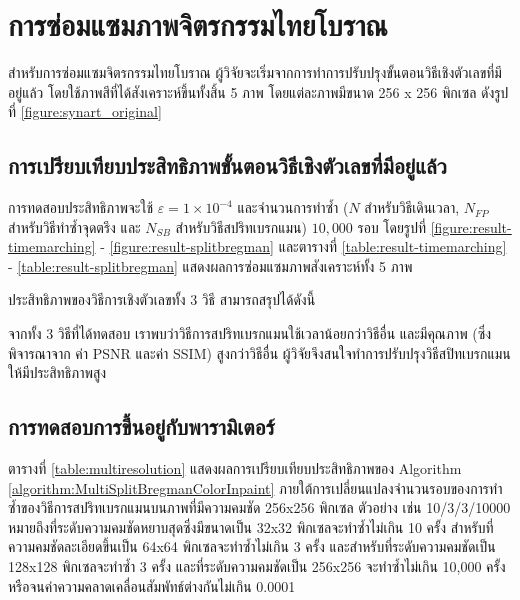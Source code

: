 \section{การซ่อมแซมภาพจิตรกรรมไทยโบราณ}
\hspace{1cm} สำหรับการซ่อมแซมจิตรกรรมไทยโบราณ ผู้วิจัยจะเริ่มจากการทำการปรับปรุงขั้นตอนวิธีเชิงตัวเลขที่มีอยู่แล้ว โดยใช้ภาพสีที่ได้สังเคราะห์ขึ้นทั้งสิ้น 5 ภาพ โดยแต่ละภาพมีขนาด 256 x 256 พิกเซล ดังรูปที่ \ref{figure:synart_original}




\clearpage
\subsection{การเปรียบเทียบประสิทธิภาพขั้นตอนวิธีเชิงตัวเลขที่มีอยู่แล้ว}
\hspace{1cm}
การทดสอบประสิทธิภาพจะใช้ $\varepsilon = 1 \times 10^{-4}$ และจำนวนการทำซ้ำ ($N$ สำหรับวิธีเดินเวลา, $N_{FP}$ สำหรับวิธีทำซ้ำจุดตรึง และ $N_{SB}$ สำหรับวิธีสปริทเบรกแมน) $10,000$ รอบ โดยรูปที่ \ref{figure:result-timemarching} - \ref{figure:result-splitbregman} และตารางที่ \ref{table:result-timemarching} - \ref{table:result-splitbregman} แสดงผลการซ่อมแซมภาพสังเคราะห์ทั้ง 5 ภาพ





	




\clearpage
\hspace{1cm} ประสิทธิภาพของวิธีการเชิงตัวเลขทั้ง 3 วิธี สามารถสรุปได้ดังนี้

\hspace{1cm} 
จากทั้ง 3 วิธีที่ได้ทดสอบ เราพบว่าวิธีการสปริทเบรกแมนใช้เวลาน้อยกว่าวิธีอื่น และมีคุณภาพ (ซึ่งพิจารณาจาก ค่า PSNR และค่า SSIM) สูงกว่าวิธีอื่น ผู้วิจัยจึงสนใจทำการปรับปรุงวิธีสปิทเบรกแมนให้มีประสิทธิภาพสูง

\subsection{การทดสอบการขึ้นอยู่กับพารามิเตอร์}

\hspace{1cm} ตารางที่ \ref{table:multiresolution} แสดงผลการเปรียบเทียบประสิทธิภาพของ Algorithm \ref{algorithm:MultiSplitBregmanColorInpaint} ภายใต้การเปลี่ยนแปลงจำนวนรอบของการทำซ้ำของวิธีการสปริทเบรกแมนบนภาพที่มีความคมชัด 256x256 พิกเซล ตัวอย่าง เช่น 10/3/3/10000 หมายถึงที่ระดับความคมชัดหยาบสุดซึ่งมีขนาดเป็น 32x32 พิกเซลจะทำซ้ำไม่เกิน 10 ครั้ง สำหรับที่ความคมชัดละเอียดขึ้นเป็น 64x64 พิกเซลจะทำซ้ำไม่เกิน 3 ครั้ง และสำหรับที่ระดับความคมชัดเป็น 128x128 พิกเซลจะทำซ้ำ 3 ครั้ง และที่ระดับความคมชัดเป็น 256x256 จะทำซ้ำไม่เกิน 10,000 ครั้งหรือจนค่าความคลาดเคลื่อนสัมพัทธ์ต่างกันไม่เกิน 0.0001 
	

